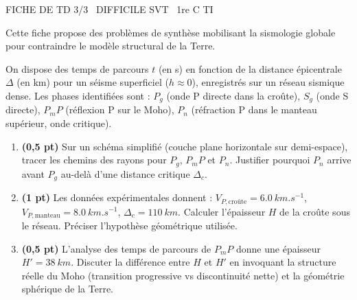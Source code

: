 \documentclass[11pt]{article}
\begin{document}
\begin{tcolorbox}[enhanced,colback=popink,colframe=popink,arc=10pt,boxrule=0pt,left=12pt,right=12pt,top=9pt,bottom=9pt]
{\color{white}\popxbold\small FICHE DE TD 3/3 \textbullet\ DIFFICILE \hfill SVT \textbullet\ 1re C TI\par}
\end{tcolorbox}
\vspace{4pt}
Cette fiche propose des problèmes de synthèse mobilisant la sismologie globale pour contraindre le modèle structural de la Terre.

\begin{exercice}
On dispose des temps de parcours $t$ (en s) en fonction de la distance épicentrale $\Delta$ (en km) pour un séisme superficiel ($h \approx 0$), enregistrés sur un réseau sismique dense. Les phases identifiées sont : $P_g$ (onde P directe dans la croûte), $S_g$ (onde S directe), $P_mP$ (réflexion P sur le Moho), $P_n$ (réfraction P dans le manteau supérieur, onde critique).

\begin{enumerate}
    \item \textbf{(0,5 pt)} Sur un schéma simplifié (couche plane horizontale sur demi-espace), tracer les chemins des rayons pour $P_g$, $P_mP$ et $P_n$. Justifier pourquoi $P_n$ arrive avant $P_g$ au-delà d'une distance critique $\Delta_c$.
    \item \textbf{(1 pt)} Les données expérimentales donnent : $V_{P,\text{croûte}} = \SI{6,0}{km.s^{-1}}$, $V_{P,\text{manteau}} = \SI{8,0}{km.s^{-1}}$, $\Delta_c = \SI{110}{km}$. Calculer l'épaisseur $H$ de la croûte sous le réseau. Préciser l'hypothèse géométrique utilisée.
    \item \textbf{(0,5 pt)} L'analyse des temps de parcours de $P_mP$ donne une épaisseur $H' = \SI{38}{km}$. Discuter la différence entre $H$ et $H'$ en invoquant la structure réelle du Moho (transition progressive vs discontinuité nette) et la géométrie sphérique de la Terre.
\end{enumerate}
\end{exercice}
\end{document}
